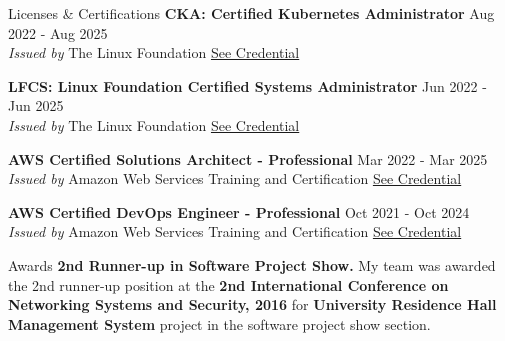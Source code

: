 \documentclass[12pt]{resume} %
\begin{document}
\begin{rSection}{Licenses \& Certifications}
{\bf CKA: Certified Kubernetes Administrator} \hfill {Aug 2022 - Aug 2025}\\
\emph{Issued by} The Linux Foundation \hfill \href{https://www.credly.com/badges/c1ac7ebc-ec4b-41fc-8e57-7041b497e4a3/linked_in_profile}{See Credential}

{\bf LFCS: Linux Foundation Certified Systems Administrator} \hfill {Jun 2022 - Jun 2025}\\
\emph{Issued by} The Linux Foundation \hfill \href{https://www.credly.com/badges/b35c7dea-4db8-48e5-b844-ace728bdbf25?source=linked_in_profile}{See Credential}

{\bf AWS Certified Solutions Architect - Professional} \hfill {Mar 2022 - Mar 2025}\\
\emph{Issued by} Amazon Web Services Training and Certification \hfill  \href{https://www.credly.com/badges/f817ec9c-67fe-49eb-a831-a1fcbe750c86?source=linked_in_profile}{See Credential}

{\bf AWS Certified DevOps Engineer - Professional} \hfill {Oct 2021 - Oct 2024}\\
\emph{Issued by} Amazon Web Services Training and Certification \hfill  \href{https://www.credly.com/badges/a8df84e2-31d4-46d4-8740-4bf51f6f7498?source=linked_in_profile}{See Credential}

\end{rSection}

\begin{rSection}{Awards} 
\textbf{2nd Runner-up in Software Project Show.} My team was awarded the 2nd runner-up position at the \textbf{2nd International Conference on Networking Systems and Security, 2016} for \textbf{University Residence Hall Management System} project in the software project show section.


\end{rSection}
\end{document}

